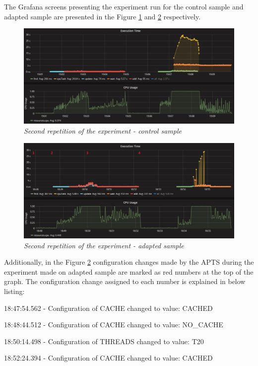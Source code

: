 \documentclass[12pt,a4paper]{article}
\let\tmpone\enumerate
\let\tmptwo\endenumerate
\renewenvironment{enumerate}{\tmpone\addtolength{\itemsep}{-0.4\baselineskip}}{\tmptwo}
\begin{document}
The Grafana screens presenting the experiment run for the control sample and adapted sample are presented in the Figure \ref{figure:random:screen:control:2} and \ref{figure:random:screen:adapted:2} respectively. 


\begin{figure}[!htb]
\centering
\includegraphics[width=1\textwidth]{2-ctrl}
\caption{\textit{Second repetition of the experiment - control sample}} \label{figure:random:screen:control:2}
\end{figure}

\begin{figure}[!htb]
\centering
\includegraphics[width=1\textwidth]{2-adap}
\caption{\textit{Second repetition of the experiment - adapted sample}} \label{figure:random:screen:adapted:2}
\end{figure}

Additionally, in the Figure \ref{figure:random:screen:adapted:2} configuration changes made by the APTS during the experiment made on adapted sample are marked as red numbers at the top of the graph. The configuration change assigned to each number is explained in below listing: 

\begin{enumerate}
\item 18:47:54.562 - Configuration of CACHE changed to value: CACHED
\item 18:48:44.512 - Configuration of CACHE changed to value: NO\_CACHE
\item 18:50:14.498 - Configuration of THREADS changed to value: T20
\item 18:52:24.394 - Configuration of CACHE changed to value: CACHED
\end{enumerate}
\end{document}
